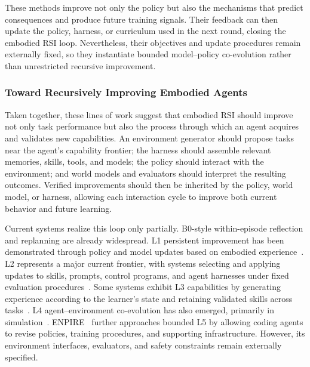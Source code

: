 These methods improve not only the policy but also the mechanisms that predict consequences and produce future training signals. Their feedback can then update the policy, harness, or curriculum used in the next round, closing the embodied RSI loop. Nevertheless, their objectives and update procedures remain externally fixed, so they instantiate bounded model--policy co-evolution rather than unrestricted recursive improvement.


\subsubsection{Toward Recursively Improving Embodied Agents}

Taken together, these lines of work suggest that embodied RSI should improve not only task performance but also the process through which an agent acquires and validates new capabilities. An environment generator should propose tasks near the agent's capability frontier; the harness should assemble relevant memories, skills, tools, and models; the policy should interact with the environment; and world models and evaluators should interpret the resulting outcomes. Verified improvements should then be inherited by the policy, world model, or harness, allowing each interaction cycle to improve both current behavior and future learning.

Current systems realize this loop only partially. B0-style within-episode reflection and replanning are already widespread. L1 persistent improvement has been demonstrated through policy and model updates based on embodied experience~\cite{ghasemipour2025selfimproving,sharma2023selfimproving,luo2025sail}. L2 represents a major current frontier, with systems selecting and applying updates to skills, prompts, control programs, and agent harnesses under fixed evaluation procedures~\cite{ju2026embodiskill,wang2026shaper,lu2026aspire}. Some systems exhibit L3 capabilities by generating experience according to the learner's state and retaining validated skills across tasks~\cite{wang2023voyager,tziafas2024lrll}. L4 agent--environment co-evolution has also emerged, primarily in simulation~\cite{wang2019poet,zala2024envgen,guo2025genenv,kang2026simworld}. ENPIRE~\cite{xiao2026enpire} further approaches bounded L5 by allowing coding agents to revise policies, training procedures, and supporting infrastructure. However, its environment interfaces, evaluators, and safety constraints remain externally specified. 

